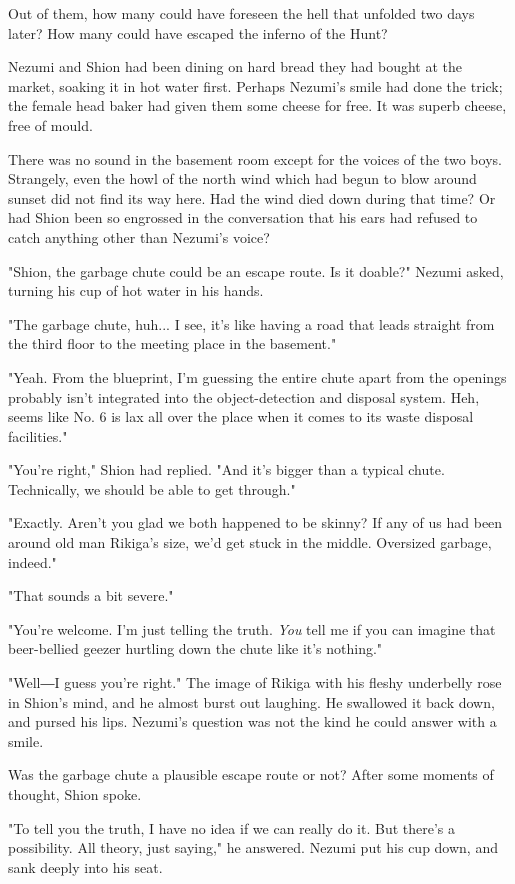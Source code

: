 Out of them, how many could have foreseen the hell that unfolded two
days later? How many could have escaped the inferno of the Hunt?

Nezumi and Shion had been dining on hard bread they had bought at the
market, soaking it in hot water first. Perhaps Nezumi's smile had done
the trick; the female head baker had given them some cheese for free. It
was superb cheese, free of mould.

There was no sound in the basement room except for the voices of the two
boys. Strangely, even the howl of the north wind which had begun to blow
around sunset did not find its way here. Had the wind died down during
that time? Or had Shion been so engrossed in the conversation that his
ears had refused to catch anything other than Nezumi's voice?

"Shion, the garbage chute could be an escape route. Is it doable?"
Nezumi asked, turning his cup of hot water in his hands.

"The garbage chute, huh... I see, it's like having a road that leads
straight from the third floor to the meeting place in the basement."

"Yeah. From the blueprint, I'm guessing the entire chute apart from the
openings probably isn't integrated into the object-detection and
disposal system. Heh, seems like No. 6 is lax all over the place when it
comes to its waste disposal facilities."

"You're right," Shion had replied. "And it's bigger than a typical
chute. Technically, we should be able to get through."

"Exactly. Aren't you glad we both happened to be skinny? If any of us
had been around old man Rikiga's size, we'd get stuck in the middle.
Oversized garbage, indeed."

"That sounds a bit severe."

"You're welcome. I'm just telling the truth. \emph{You} tell me if you can
imagine that beer-bellied geezer hurtling down the chute like it's
nothing."

"Well―I guess you're right." The image of Rikiga with his fleshy
underbelly rose in Shion's mind, and he almost burst out laughing. He
swallowed it back down, and pursed his lips. Nezumi's question was not
the kind he could answer with a smile.

Was the garbage chute a plausible escape route or not? After some
moments of thought, Shion spoke.

"To tell you the truth, I have no idea if we can really do it. But
there's a possibility. All theory, just saying," he answered. Nezumi put
his cup down, and sank deeply into his seat.

